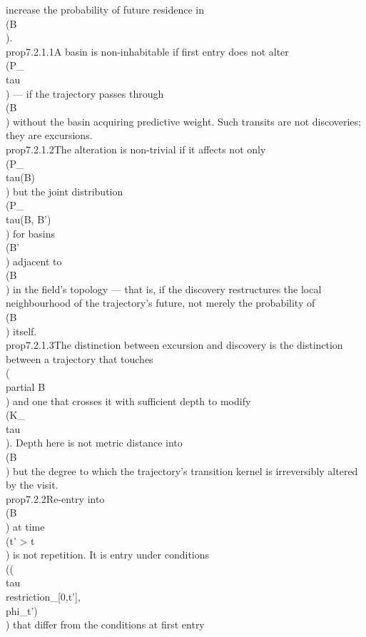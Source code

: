{{{{{increase the probability of future residence in \\(B\\).}\n\n\\prop{7.2.1.1}{A basin is non-inhabitable if first entry does not alter \\(P_\\tau\\) — if the trajectory passes through \\(B\\) without the basin acquiring predictive weight. Such transits are not discoveries; they are excursions.}\n\n\\prop{7.2.1.2}{The alteration is non-trivial if it affects not only \\(P_\\tau(B)\\) but the joint distribution \\(P_\\tau(B, B')\\) for basins \\(B'\\) adjacent to \\(B\\) in the field's topology — that is, if the discovery restructures the local neighbourhood of the trajectory's future, not merely the probability of \\(B\\) itself.}\n\n\\prop{7.2.1.3}{The distinction between excursion and discovery is the distinction between a trajectory that touches \\(\\partial B\\) and one that crosses it with sufficient depth to modify \\(K_\\tau\\). Depth here is not metric distance into \\(B\\) but the degree to which the trajectory's transition kernel is irreversibly altered by the visit.}\n\n\\prop{7.2.2}{Re-entry into \\(B\\) at time \\(t' > t\\) is not repetition. It is entry under conditions \\((\\tau\\restriction_{[0,t']}, \\phi_{t'})\\) that differ from the conditions at first entry }}}}}
